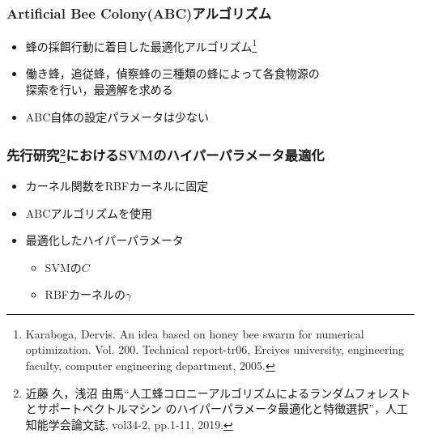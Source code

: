 \documentclass[11pt,dvipdfmx,cjk]{beamer}
\begin{document}
  \begin{frame}
    \frametitle{Artificial Bee Colony(ABC)アルゴリズム}
    \begin{itemize}
      \item 蜂の採餌行動に着目した最適化アルゴリズム\footnote{Karaboga, Dervis. An idea based on honey bee swarm for numerical optimization. Vol. 200. Technical report-tr06, Erciyes university, engineering faculty, computer engineering department, 2005.}
      \item 働き蜂，追従蜂，偵察蜂の三種類の蜂によって各食物源の\\探索を行い，最適解を求める
      \item ABC自体の設定パラメータは少ない
    \end{itemize}
  \end{frame}
  \begin{frame}
    \frametitle{先行研究\footnote{近藤 久，浅沼 由馬“人工蜂コロニーアルゴリズムによるランダムフォレストとサポートベクトルマシン
    のハイパーパラメータ最適化と特徴選択”，人工知能学会論文誌, vol34-2, pp.1-11, 2019.}におけるSVMのハイパーパラメータ最適化}
    \begin{itemize}
      \item カーネル関数をRBFカーネルに固定
      \item ABCアルゴリズムを使用
      \item 最適化したハイパーパラメータ
      \begin{itemize}
        \item SVMの$C$
        \item RBFカーネルの$\gamma$
      \end{itemize}
    \end{itemize}
\end{frame}
\end{document}
